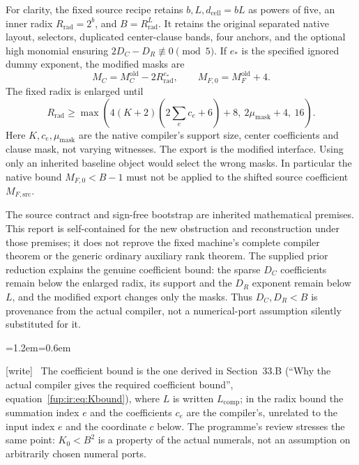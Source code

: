 \documentclass[11pt,letterpaper]{article}
\theoremstyle{definition}\newtheorem{definition}[theorem]{Definition}
\theoremstyle{remark}\newtheorem{remark}[theorem]{Remark}
\newcommand{\code}[1]{\texttt{\detokenize{#1}}}
\newcommand{\MC}{M_C}
\newcommand{\dcell}{d_{\mathrm{cell}}}
\newcommand{\MFsrcV}{M_{F,\mathrm{src}}}
\newcommand{\MFnatV}{M_{F,0}}
\newcommand{\wtag}{\textup{[write]}}
\newenvironment{writenote}{\par\smallskip\begin{list}{}{\leftmargin=1.2em\rightmargin=0.6em}\item[]\small\wtag\ }{\end{list}\smallskip}
\begin{document}
For clarity, the fixed source recipe retains $b,L,\dcell=bL$ as powers of five, an inner radix $R_{\mathrm{rad}}=2^b$, and $B=R_{\mathrm{rad}}^L$. It retains the original separated native layout, selectors, duplicated center-clause bands, four anchors, and the optional high monomial ensuring $2D_C-D_R\not\equiv0\pmod5$. If $e_*$ is the specified ignored dummy exponent, the modified masks are
\[
 \MC=\MC^{\mathrm{old}}-2R_{\mathrm{rad}}^{e_*},\qquad
 \MFnatV=M_F^{\mathrm{old}}+4.
\]
The fixed radix is enlarged until
\[
 R_{\mathrm{rad}}\ge
 \max\!\left(4(K+2)\left(2\sum_e c_e+6\right)+8,\ 2\mu_{\mathrm{mask}}+4,\ 16\right).
\]
Here $K,c_e,\mu_{\mathrm{mask}}$ are the native compiler's support size, center coefficients and clause mask, not varying witnesses. The export is the modified \code{new_constants(compile_windows(...))} interface. Using only an inherited baseline \code{constants()} object would select the wrong masks. In particular the native bound $\MFnatV<B-1$ must not be applied to the shifted source coefficient $\MFsrcV$.

The source contract and sign-free bootstrap are inherited mathematical premises. This report is self-contained for the new obstruction and reconstruction under those premises; it does not reprove the fixed machine's complete compiler theorem or the generic ordinary auxiliary rank theorem. The supplied prior reduction explains the genuine coefficient bound: the sparse $D_C$ coefficients remain below the enlarged radix, its support and the $D_R$ exponent remain below $L$, and the modified export changes only the masks. Thus $D_C,D_R<B$ is provenance from the actual compiler, not a numerical-port assumption silently substituted for it.
\begin{writenote}
The coefficient bound is the one derived in Section~33.B (``Why the actual compiler gives the required coefficient bound'', equation~\eqref{fup:ir:eq:Kbound}), where $L$ is written $L_{\mathrm{comp}}$; in the radix bound the summation index $e$ and the coefficients $c_e$ are the compiler's, unrelated to the input index $e$ and the coordinate $c$ below. The programme's review stresses the same point: $K_0<B^2$ is a property of the actual numerals, not an assumption on arbitrarily chosen numeral ports.
\end{writenote}
\end{document}
